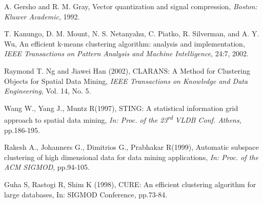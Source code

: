 
\begin{thebibliography}{9}
	A. Gersho and R. M. Gray, Vector quantization and signal compression, \textit{ Boston: Kluwer Academic}, 1992.
	
	T. Kanungo, D. M. Mount, N. S. Netanyahu, C. Piatko,
	R. Silverman, and A. Y. Wu, An efficient k-means clustering algorithm: analysis and implementation,
	\textit{IEEE Transactions on Pattern Analysis and Machine Intelligence}, 24:7, 2002.
	
	Raymond T. Ng and Jiawei Han (2002), CLARANS: A Method 
	for Clustering Objects for Spatial Data Mining, \textit{ IEEE Transactions on Knowledge and Data Engineering}, Vol. 14, No. 5.
	
	Wang W., Yang J., Muntz R(1997), STING: A statistical information grid approach to spatial data mining, \textit{In: Proc. of the 23\textsuperscript{rd} VLDB Conf. Athens}, pp.186-195.
	
	Rakesh A., Johanners G., Dimitrios G., Prabhakar R(1999), Automatic subspace clustering of high  dimensional data for data mining applications, \textit{In: Proc. of the ACM SIGMOD}, pp.94-105.
	
	Guha S, Rastogi R, Shim K (1998), CURE: An  efficient  clustering  algorithm for large databases, In: SIGMOD Conference, pp.73-84. 
	
	 
\end{thebibliography}